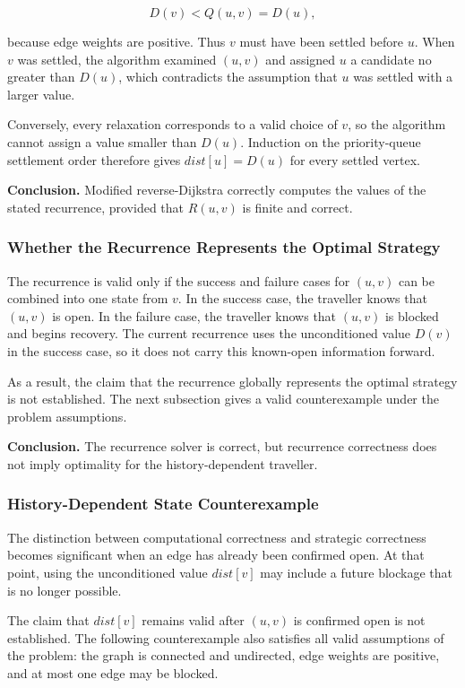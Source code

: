\documentclass{article}
\begin{document}
\[
D(v)<Q(u,v)=D(u),
\]

because edge weights are positive. Thus $v$ must have been settled before $u$. When $v$ was settled, the algorithm examined $(u,v)$ and assigned $u$ a candidate no greater than $D(u)$, which contradicts the assumption that $u$ was settled with a larger value.

Conversely, every relaxation corresponds to a valid choice of $v$, so the algorithm cannot assign a value smaller than $D(u)$. Induction on the priority-queue settlement order therefore gives $dist[u]=D(u)$ for every settled vertex.

\noindent\textbf{Conclusion.} Modified reverse-Dijkstra correctly computes the values of the stated recurrence, provided that $R(u,v)$ is finite and correct.

\subsubsection{Whether the Recurrence Represents the Optimal Strategy}

The recurrence is valid only if the success and failure cases for $(u,v)$ can be combined into one state from $v$. In the success case, the traveller knows that $(u,v)$ is open. In the failure case, the traveller knows that $(u,v)$ is blocked and begins recovery. The current recurrence uses the unconditioned value $D(v)$ in the success case, so it does not carry this known-open information forward.

As a result, the claim that the recurrence globally represents the optimal strategy is not established. The next subsection gives a valid counterexample under the problem assumptions.

\noindent\textbf{Conclusion.} The recurrence solver is correct, but recurrence correctness does not imply optimality for the history-dependent traveller.

\subsubsection{History-Dependent State Counterexample}

The distinction between computational correctness and strategic correctness becomes significant when an edge has already been confirmed open. At that point, using the unconditioned value $dist[v]$ may include a future blockage that is no longer possible.

The claim that $dist[v]$ remains valid after $(u,v)$ is confirmed open is not established. The following counterexample also satisfies all valid assumptions of the problem: the graph is connected and undirected, edge weights are positive, and at most one edge may be blocked.
\end{document}
